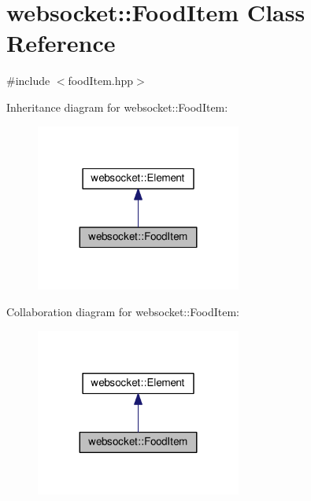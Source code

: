 \hypertarget{classwebsocket_1_1FoodItem}{}\section{websocket\+:\+:Food\+Item Class Reference}
\label{classwebsocket_1_1FoodItem}


{\ttfamily \#include $<$food\+Item.\+hpp$>$}



Inheritance diagram for websocket\+:\+:Food\+Item\+:
\nopagebreak
\begin{figure}[H]
\begin{center}
\leavevmode
\includegraphics[width=191pt]{classwebsocket_1_1FoodItem__inherit__graph}
\end{center}
\end{figure}


Collaboration diagram for websocket\+:\+:Food\+Item\+:
\nopagebreak
\begin{figure}[H]
\begin{center}
\leavevmode
\includegraphics[width=191pt]{classwebsocket_1_1FoodItem__coll__graph}
\end{center}
\end{figure}
